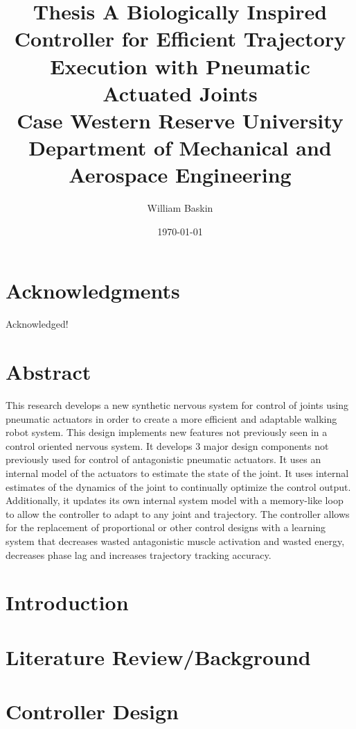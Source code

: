 \documentclass[12pt, letterpaper, oneside, onecolumn]{report} %
\author{William Baskin}
\title{Thesis}
\title{
  {A Biologically Inspired Controller for Efficient Trajectory Execution with Pneumatic Actuated Joints}\\
  {\large Case Western Reserve University \\
  Department of Mechanical and Aerospace Engineering}%
}
\date{\today}
\begin{document}
\maketitle


\tableofcontents

\listoffigures

\chapter*{Acknowledgments}
\label{chap:acknowledgements}
Acknowledged!

\chapter*{Abstract}
\label{chap:abstract}

This research develops a new synthetic nervous system for control of joints using pneumatic actuators in order to create a more efficient and adaptable walking robot system. This design implements new features not previously seen in a control oriented nervous system. It develops 3 major design components not previously used for control of antagonistic pneumatic actuators. It uses an internal model of the actuators to estimate the state of the joint. It uses internal estimates of the dynamics of the joint to continually optimize the control output. Additionally, it updates its own internal system model with a memory-like loop to allow the controller to adapt to any joint and trajectory. The controller allows for the replacement of proportional or other control designs with a learning system that decreases wasted antagonistic muscle activation and wasted energy, decreases phase lag and increases trajectory tracking accuracy.

\chapter{Introduction}
\label{chap:introduction}


\chapter{Literature Review/Background}
\label{chap:lit_review}


\chapter{Controller Design}
\label{chap:controller_design}

\end{document}

